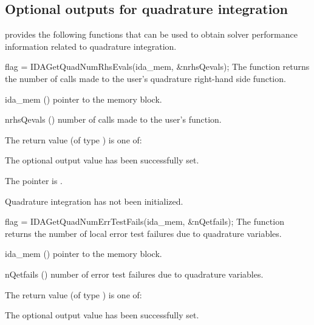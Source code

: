 {%

\subsection{Optional outputs for quadrature integration}\label{ss:quad_optional_output}

{\idas} provides the following functions that can be used to obtain solver
performance information related to quadrature integration.

{
  flag = IDAGetQuadNumRhsEvals(ida\_mem, \&nrhsQevals);
}
{
  The function  returns the
  number of calls made to the user's quadrature right-hand side function.
}
{
  \begin{args}
  \item[ida\_mem] ()
    pointer to the {\idas} memory block.
  \item[nrhsQevals] ()
    number of calls made to the user's  function.
  \end{args}
}
{
  The return value  (of type ) is one of:
  \begin{args}
  \item[\Id{IDA\_SUCCESS}]
    The optional output value has been successfully set.
  \item[\Id{IDA\_MEM\_NULL}]
    The  pointer is .
  \item[\Id{IDA\_NO\_QUAD}]
    Quadrature integration has not been initialized.
  \end{args}
}
{}
{
  flag = IDAGetQuadNumErrTestFails(ida\_mem, \&nQetfails);
}
{
  The function  returns the
  number of local error test failures due to quadrature variables.
}
{
  \begin{args}
  \item[ida\_mem] ()
    pointer to the {\idas} memory block.
  \item[nQetfails] ()
    number of error test failures due to quadrature variables.
  \end{args}
}
{
  The return value  (of type ) is one of:
  \begin{args}
  \item[\Id{IDA\_SUCCESS}]
    The optional output value has been successfully set.

\end{args}}}
